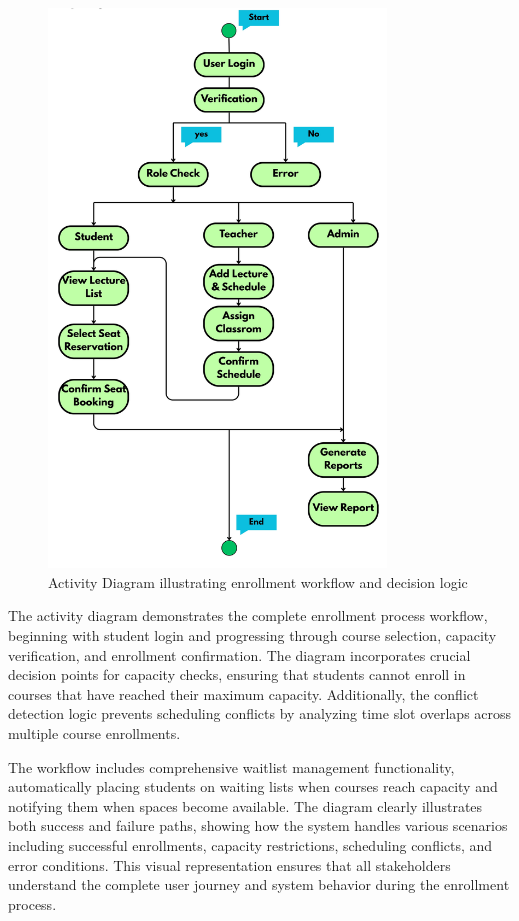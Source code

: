 \begin{figure}[H]
    \centering
    \includegraphics[width=0.8\textwidth,height=0.6\textheight,keepaspectratio]{images/Activity Diagram.jpg}
    \caption{Activity Diagram illustrating enrollment workflow and decision logic}
    \label{fig:activity}
\end{figure}

The activity diagram demonstrates the complete enrollment process workflow, beginning with student login and progressing through course selection, capacity verification, and enrollment confirmation. The diagram incorporates crucial decision points for capacity checks, ensuring that students cannot enroll in courses that have reached their maximum capacity. Additionally, the conflict detection logic prevents scheduling conflicts by analyzing time slot overlaps across multiple course enrollments.

The workflow includes comprehensive waitlist management functionality, automatically placing students on waiting lists when courses reach capacity and notifying them when spaces become available. The diagram clearly illustrates both success and failure paths, showing how the system handles various scenarios including successful enrollments, capacity restrictions, scheduling conflicts, and error conditions. This visual representation ensures that all stakeholders understand the complete user journey and system behavior during the enrollment process.

